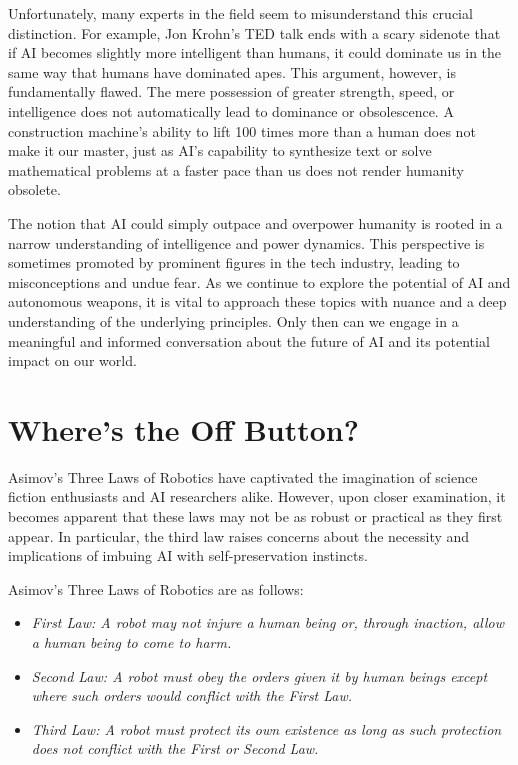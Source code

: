 Unfortunately, many experts in the field seem to misunderstand this crucial distinction. For example, Jon Krohn's TED talk ends with a scary sidenote that if AI becomes slightly more intelligent than humans, it could dominate us in the same way that humans have dominated apes. This argument, however, is fundamentally flawed. The mere possession of greater strength, speed, or intelligence does not automatically lead to dominance or obsolescence. A construction machine's ability to lift 100 times more than a human does not make it our master, just as AI's capability to synthesize text or solve mathematical problems at a faster pace than us does not render humanity obsolete.

The notion that AI could simply outpace and overpower humanity is rooted in a narrow understanding of intelligence and power dynamics. This perspective is sometimes promoted by prominent figures in the tech industry, leading to misconceptions and undue fear. As we continue to explore the potential of AI and autonomous weapons, it is vital to approach these topics with nuance and a deep understanding of the underlying principles. Only then can we engage in a meaningful and informed conversation about the future of AI and its potential impact on our world.


\section{Where's the Off Button?}

Asimov's Three Laws of Robotics have captivated the imagination of science fiction enthusiasts and AI researchers alike. However, upon closer examination, it becomes apparent that these laws may not be as robust or practical as they first appear. In particular, the third law raises concerns about the necessity and implications of imbuing AI with self-preservation instincts.

Asimov's Three Laws of Robotics are as follows:

\begin{itemize}
\item\textit{First Law: A robot may not injure a human being or, through inaction, allow a human being to come to harm.}
\item\textit{Second Law: A robot must obey the orders given it by human beings except where such orders would conflict with the First Law.}
\item\textit{Third Law: A robot must protect its own existence as long as such protection does not conflict with the First or Second Law.}
\end{itemize}

